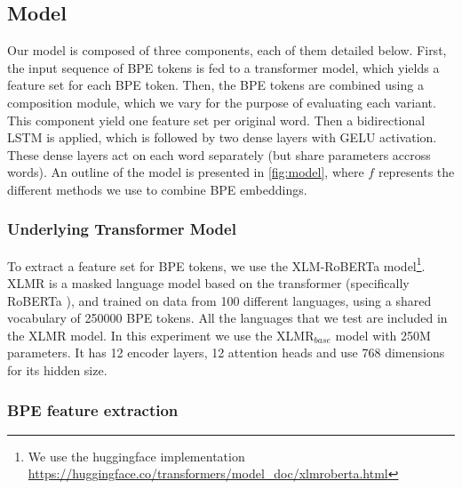 \documentclass[11pt]{article}
\newcommand\citep{\cite}
\begin{document}
	\subsection{Model}

        Our model is composed of three components, each of them
        detailed below. First, the input sequence of BPE tokens is fed
        to a transformer model, which yields a feature set for each
        BPE token. Then, the BPE tokens are combined using a
        composition module, which we vary for the purpose of
        evaluating each variant. This component yield one feature set
        per original word. Then a bidirectional LSTM is applied, which
        is followed by two dense layers with GELU \citep{hendrycks2016gaussian}
        activation. These dense layers act on each word separately (but
        share parameters accross words).  An outline of the model is
        presented in \cref{fig:model}, where $f$ represents the
        different methods we use to combine BPE embeddings.

	\subsubsection{Underlying Transformer Model}
     To extract a feature set for BPE tokens, we use the
     XLM-RoBERTa \cite{conneau2019unsupervised} model\footnote{We use the
     huggingface implementation
     \url{https://huggingface.co/transformers/model_doc/xlmroberta.html}}. XLMR
     is a masked language model based on the transformer
     (specifically RoBERTa \citep{liu2019roberta}), and trained on
     data from 100 different languages, using a shared vocabulary of
     250000 BPE tokens. All the languages that we test are included in the
     XLMR model. In this experiment we use the \textsc{XLMR}$_{base}$
     model with 250M parameters. It has 12 encoder layers, 12 attention heads and use 768
     dimensions for its hidden size.

	\subsubsection{BPE feature extraction}
        \label{sec:bpe-features}

\end{document}
